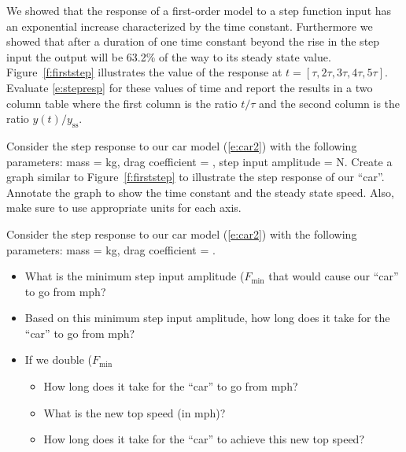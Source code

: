 \begin{ex}
We showed that the response of a first-order model to a step function input has an exponential increase characterized by the time constant.  Furthermore we showed that after a duration of one time constant beyond the rise in the step input the output will be 63.2\% of the way to its steady state value.  Figure~\ref{f:firststep} illustrates the value of the response at  $t=[\tau,2\tau,3\tau,4\tau,5\tau]$.  Evaluate \ref{e:stepresp} for these values of time and report the results in a two column table where the first column is the ratio $t/\tau$ and the second column is the ratio $y(t)/y_{\mathrm{ss}}$.
\end{ex}

\begin{ex}
Consider the step response to our car model (\ref{e:car2}) with the following parameters: mass = \unit[750]{kg}, drag coefficient = , step input amplitude = \unit[10,000]{N}.  Create a graph similar to Figure~\ref{f:firststep} to illustrate the step response of our ``car''.  Annotate the graph to show the time constant and the steady state speed.  Also, make sure to use appropriate units for each axis.
\end{ex}

\begin{ex}
Consider the step response to our car model (\ref{e:car2}) with the following parameters: mass = \unit[750]{kg}, drag coefficient = .
\begin{itemize}
\item What is the minimum step input amplitude ($F_{\mathrm{min}}$ that would cause our ``car'' to go from \unit[0--60]{mph}?
\item Based on this minimum step input amplitude, how long does it take for the ``car'' to go from \unit[0--60]{mph}?
\item If we double ($F_{\mathrm{min}}$
 \begin{itemize}
 \item How long does it take for the ``car'' to go from \unit[0--60]{mph}?
 \item What is the new top speed (in mph)?
 \item How long does it take for the ``car'' to achieve this new top speed?
 \end{itemize}
\end{itemize}
\end{ex}

